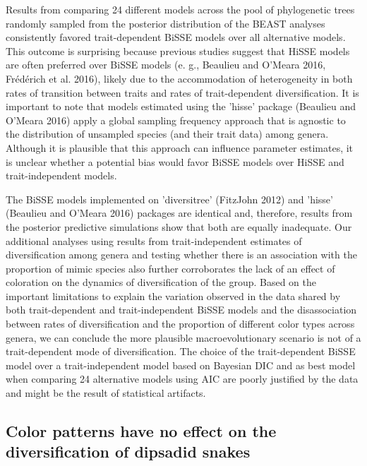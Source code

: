 Results from comparing 24 different models across the pool of phylogenetic trees randomly sampled from the posterior distribution of the BEAST analyses consistently favored trait-dependent BiSSE models over all alternative models. This outcome is surprising because previous studies suggest that HiSSE models are often preferred over BiSSE models (e. g., Beaulieu and O'Meara 2016, Frédérich et al. 2016), likely due to the accommodation of heterogeneity in both rates of transition between traits and rates of trait-dependent diversification. It is important to note that models estimated using the 'hisse' package (Beaulieu and O'Meara 2016) apply a global sampling frequency approach that is agnostic to the distribution of unsampled species (and their trait data) among genera. Although it is plausible that this approach can influence parameter estimates, it is unclear whether a potential bias would favor BiSSE models over HiSSE and trait-independent models.

The BiSSE models implemented on 'diversitree' (FitzJohn 2012) and 'hisse' (Beaulieu and O'Meara 2016) packages are identical and, therefore, results from the posterior predictive simulations show that both are equally inadequate. Our additional analyses using results from trait-independent estimates of diversification among genera and testing whether there is an association with the proportion of mimic species also further corroborates the lack of an effect of coloration on the dynamics of diversification of the group. Based on the important limitations to explain the variation observed in the data shared by both trait-dependent and trait-independent BiSSE models and the disassociation between rates of diversification and the proportion of different color types across genera, we can conclude the more plausible macroevolutionary scenario is not of a trait-dependent mode of diversification. The choice of the trait-dependent BiSSE model over a trait-independent model based on Bayesian DIC and as best model when comparing 24 alternative models using AIC are poorly justified by the data and might be the result of statistical artifacts.

\subsection{Color patterns have no effect on the diversification of dipsadid snakes}

